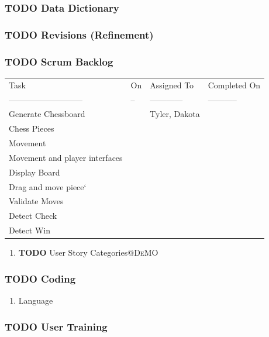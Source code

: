 \documentclass[11pt]{article}
\begin{document}
\subsubsection{{\bfseries\sffamily TODO} Data Dictionary}
\label{sec:orgc6ac4b9}
\subsubsection{{\bfseries\sffamily TODO} Revisions (Refinement)}
\label{sec:org71e9676}
\subsubsection{{\bfseries\sffamily TODO} Scrum Backlog}
\label{sec:org6b30145}
\begin{center}
\begin{tabular}{llll}
Task & On & Assigned To & Completed On\\
--------------------------- & -- & ------------ & -----------\\
Generate Chessboard &  & Tyler, Dakota & \\
Chess Pieces &  &  & \\
Movement &  &  & \\
Movement and player interfaces &  &  & \\
Display Board &  &  & \\
Drag and move piece` &  &  & \\
Validate Moves &  &  & \\
Detect Check &  &  & \\
Detect Win &  &  & \\
\end{tabular}
\end{center}
\begin{enumerate}
\item {\bfseries\sffamily TODO} User Story Categories\hfill{}\textsc{@DeMO}
\label{sec:org712c851}
\end{enumerate}
\subsubsection{{\bfseries\sffamily TODO} Coding}
\label{sec:org85c851e}
\begin{enumerate}
\item Language
\label{sec:org4f37990}
\end{enumerate}
\subsubsection{{\bfseries\sffamily TODO} User Training}
\label{sec:orgfe4e928}
\end{document}
